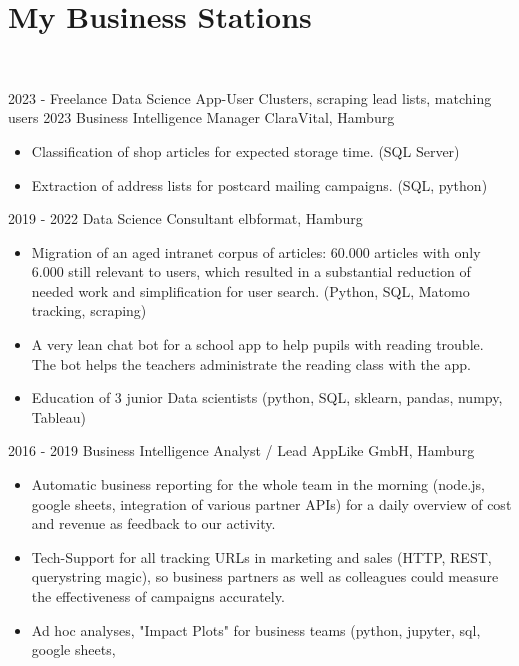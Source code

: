 \documentclass[a4paper]{twentysecondcv} %
\begin{document}
\section{My Business Stations}\\
\begin{twenty}
  \twentyitem
    {2023 - }
    {Freelance Data Science}
    {}
    {App-User Clusters, scraping lead lists, matching users}
  \twentyitem
    {2023}
    {Business Intelligence Manager}
    {ClaraVital, Hamburg}
    {\begin{itemize}
    \item Classification of shop articles for expected storage time. (SQL Server)
    \item Extraction of address lists for postcard mailing campaigns. (SQL, python)
    \end{itemize}}
  \twentyitem
    {2019 - 2022}
    {Data Science Consultant}
    {elbformat, Hamburg}
    {\begin{itemize}
    \item Migration of an aged intranet corpus of articles: 60.000 articles with only 6.000 still
          relevant to users, which resulted in a substantial reduction of needed work and 
          simplification for user search. (Python, SQL, Matomo tracking, scraping)
    \item A very lean chat bot for a school app to help pupils with reading trouble. The bot helps
          the teachers administrate the reading class with the app.
    \item Education of 3 junior Data scientists (python, SQL, sklearn, pandas, numpy, Tableau)
    \end{itemize}}
  \twentyitem
    {2016 - 2019}
    {Business Intelligence Analyst / Lead}
    {AppLike GmbH, Hamburg}
    {\begin{itemize}
    \item Automatic business reporting for the whole team in the morning (node.js, google sheets, 
    integration of various partner APIs) for a daily overview of cost and revenue as feedback to our
    activity.
    \item Tech-Support for all tracking URLs in marketing and sales (HTTP, REST, querystring magic),
    so business partners as well as colleagues could measure the effectiveness of campaigns accurately.
    \item Ad hoc analyses, "Impact Plots" for business teams (python, jupyter, sql, google sheets, 

\end{itemize}}
\end{twenty}
\end{document}
